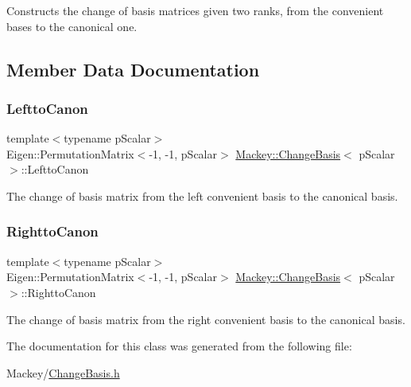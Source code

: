 Constructs the change of basis matrices given two ranks, from the convenient bases to the canonical one. 



\subsection{Member Data Documentation}
\mbox{\label{classMackey_1_1ChangeBasis_a784f69cb8de92e84fef755461c60d3d0}} 
\subsubsection{\texorpdfstring{Leftto\+Canon}{LefttoCanon}}
{\footnotesize\ttfamily template$<$typename p\+Scalar$>$ \\
Eigen\+::\+Permutation\+Matrix$<$-\/1, -\/1, p\+Scalar$>$ \hyperlink{classMackey_1_1ChangeBasis}{Mackey\+::\+Change\+Basis}$<$ p\+Scalar $>$\+::Leftto\+Canon}



The change of basis matrix from the left convenient basis to the canonical basis. 

\mbox{\label{classMackey_1_1ChangeBasis_aa169c2e7937437ea2102de1c3072194c}} 
\subsubsection{\texorpdfstring{Rightto\+Canon}{RighttoCanon}}
{\footnotesize\ttfamily template$<$typename p\+Scalar$>$ \\
Eigen\+::\+Permutation\+Matrix$<$-\/1, -\/1, p\+Scalar$>$ \hyperlink{classMackey_1_1ChangeBasis}{Mackey\+::\+Change\+Basis}$<$ p\+Scalar $>$\+::Rightto\+Canon}



The change of basis matrix from the right convenient basis to the canonical basis. 



The documentation for this class was generated from the following file\+:\begin{DoxyCompactItemize}
\item 
Mackey/\hyperlink{ChangeBasis_8h}{Change\+Basis.\+h}\end{DoxyCompactItemize}
